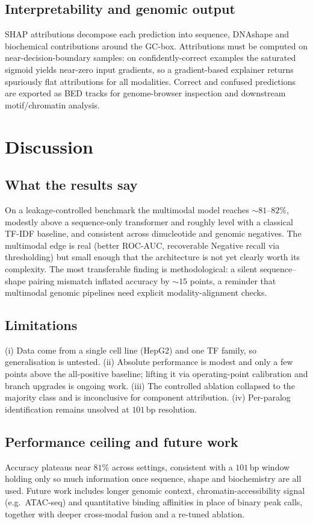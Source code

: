\documentclass[11pt]{article}
\begin{document}
\subsection{Interpretability and genomic output}
SHAP attributions decompose each prediction into sequence, DNAshape and biochemical
contributions around the GC-box. Attributions must be computed on near-decision-boundary
samples: on confidently-correct examples the saturated sigmoid yields near-zero input
gradients, so a gradient-based explainer returns spuriously flat attributions for all
modalities. Correct and confused predictions are exported as BED tracks for
genome-browser inspection and downstream motif/chromatin analysis.

\section{Discussion}

\subsection{What the results say}
On a leakage-controlled benchmark the multimodal model reaches $\sim\!81$--$82\%$,
modestly above a sequence-only transformer and roughly level with a classical TF-IDF
baseline, and consistent across dinucleotide and genomic negatives. The multimodal
edge is real (better ROC-AUC, recoverable Negative recall via thresholding) but
small enough that the architecture is not yet clearly worth its complexity. The most
transferable finding is methodological: a silent sequence--shape pairing mismatch
inflated accuracy by $\sim\!15$ points, a reminder that multimodal genomic pipelines
need explicit modality-alignment checks.

\subsection{Limitations}
(i) Data come from a single cell line (HepG2) and one TF family, so generalisation is
untested. (ii) Absolute performance is modest and only a few points above the
all-positive baseline; lifting it via operating-point calibration and branch upgrades
is ongoing work. (iii) The controlled ablation collapsed to the majority class and is
inconclusive for component attribution. (iv) Per-paralog identification remains
unsolved at $101$\,bp resolution.

\subsection{Performance ceiling and future work}
Accuracy plateaus near $81\%$ across settings, consistent with a $101$\,bp window
holding only so much information once sequence, shape and biochemistry are all used.
Future work includes longer genomic context, chromatin-accessibility signal (e.g.\
ATAC-seq) and quantitative binding affinities in place of binary peak calls, together
with deeper cross-modal fusion and a re-tuned ablation.
\end{document}
